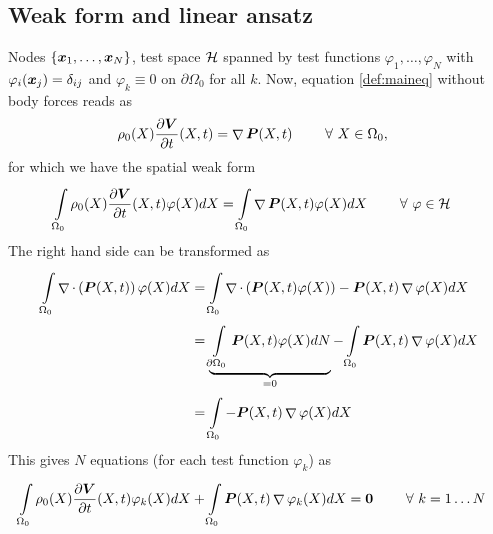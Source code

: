 \documentclass[a4paper,12pt]{article}
\newcommand{\Or}{\Omega_0}
\newcommand{\intor}{\intl{\Or}{}}
\newcommand{\intorb}{\intl{\partial\Or}{}}
\DeclareMathOperator{\divergence}{\nabla}
\renewcommand{\div}[1]{\divergence\cdot\left(#1\right)}
\begin{document}
\subsection{Weak form and linear ansatz}
Nodes $\{\boldsymbol{x}_1,\ldots,\boldsymbol{x}_N\}$, test space $\mathcal{H}$ spanned by test functions
$\varphi_1,\ldots,\varphi_N$ with $\varphi_i(\boldsymbol{x}_j) = \delta_{ij}$ and $\varphi_k \equiv 0$ on $\partial\Or$ for all $k$.
Now, equation \eqref{def:maineq} without body forces reads as 
\begin{align}
	\rho_0(X)\d{\vV}{t}(X,t) &= \divergence\vP(X,t) \qquad \fo X\in\Or,
\end{align}
for which we have the spatial weak form
\begin{align}
	\intor\rho_0(X)\d{\vV}{t}(X,t)\varphi(X)dX &= \intor\divergence\vP(X,t)\varphi(X)dX \qquad\fo \varphi\in\H
\end{align}
The right hand side can be transformed as
\begin{align*}
	\intor \div{\vP(X,t)}\varphi(X) dX &= \intor \div{\vP(X,t)\varphi(X)} - \vP(X,t)\divergence\varphi(X) dX\\
		 &= \underbrace{\intorb \vP(X,t)\varphi(X) dN}_{=0} - \intor \vP(X,t)\divergence\varphi(X)dX\\
		 &= \intor -\vP(X,t)\divergence\varphi(X) dX
\end{align*}
This gives $N$ equations (for each test function $\varphi_k$) as
\begin{align}
	\intor \rho_0(X)\d{\vV}{t}(X,t)\varphi_k(X)dX + \intor\vP(X,t)\divergence\varphi_k(X) dX &= \vnull\qquad \fo k=1\ldots N\label{def:weakform}
\end{align}
\end{document}
